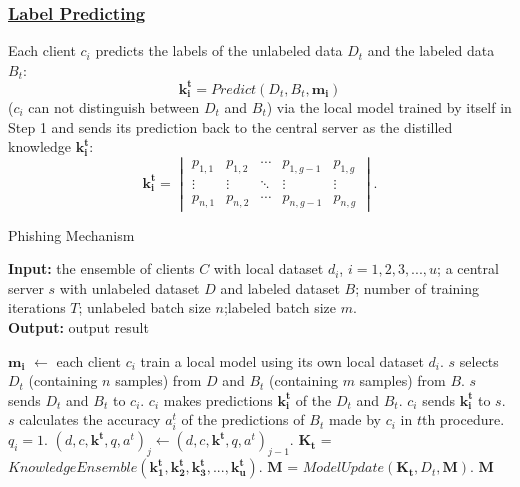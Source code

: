 \documentclass[journal]{IEEEtran}
\begin{document}
  \subsubsection{\ul{Label Predicting}} Each client $c_i$ predicts the labels of the unlabeled data $D_t$ and the labeled data $B_t$:
  \begin{equation}
    \mathbf{k_i^t}=Predict(D_t, B_t, \mathbf{m_i})
  \end{equation}
  ($c_i$ can not distinguish between $D_t$ and $B_t$) via the local model trained by itself in Step 1  and sends its prediction back to the central server as the distilled knowledge $\mathbf{k_i^t}$:
  \begin{equation}
    \mathbf{k_i^t}=\begin{vmatrix}
      p_{1,1} & p_{1,2} & \cdots  & p_{1,g-1} & p_{1,g}\\ 
      \vdots  & \vdots & \ddots  & \vdots & \vdots\\ 
      p_{n,1} & p_{n,2} & \cdots  & p_{n,g-1} & p_{n,g}
      \end{vmatrix}.
  \end{equation}

  \begin{algorithm}[t]
    \caption{Phishing Mechanism} 
    \hspace*{0.02in} {\bf Input:} 
    the ensemble of clients $C$ with local dataset $d_i$, $i=1,2,3,...,u$; a central server $s$ with unlabeled dataset $D$ and labeled dataset $B$; number of training iterations $T$; unlabeled batch size $n$;labeled batch size $m$.\\
    \hspace*{0.02in} {\bf Output:} 
    output result
    \begin{algorithmic}[1]
      \State $\mathbf{m_i}$ $\gets$ each client $c_i$ train a local model using its own local dataset $d_i$.
        \State $s$ selects $D_t$ (containing $n$ samples) from $D$ and $B_t$ (containing $m$ samples) from $B$.
          \State $s$ sends $D_t$ and $B_t$ to $c_i$.
          \State $c_i$ makes predictions $\mathbf{k_i^t}$ of the $D_t$ and $B_t$.
          \State $c_i$ sends $\mathbf{k_i^t}$ to $s$.
          \State $s$ calculates the accuracy $a_i^t$ of the predictions of $B_t$ made by $c_i$ in $t$th procedure.
            \State $q_i = 1$.
              \State $(d,c,\mathbf{k^t},q,a^t)_j \gets (d,c,\mathbf{k^t},q,a^t)_{j-1}$.
            \EndFor
          \EndIf
        \EndFor
        \State $\mathbf{K_t}$ = $KnowledgeEnsemble(\mathbf{k_1^t},\mathbf{k_2^t},\mathbf{k_3^t},...,\mathbf{k_u^t})$.
        \State $\mathbf{M}$ = $ModelUpdate(\mathbf{K_t}, D_t, \mathbf{M})$.
      \EndFor
      \State\Return $\mathbf{M}$
    \end{algorithmic}
    \end{algorithm}
\end{document}
